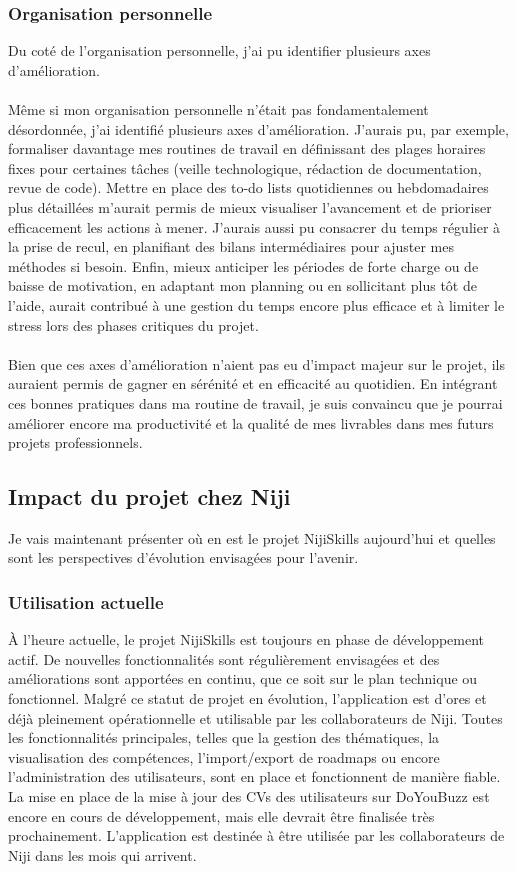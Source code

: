 \documentclass[12pt]{article}
\begin{document}
\subsubsection{Organisation personnelle}
Du coté de l'organisation personnelle, j'ai pu identifier plusieurs axes d'amélioration.
\\\\
Même si mon organisation personnelle n’était pas fondamentalement désordonnée, j’ai identifié plusieurs axes d’amélioration. J’aurais pu, par exemple, formaliser davantage mes routines de travail en définissant des plages horaires fixes pour certaines tâches (veille technologique, rédaction de documentation, revue de code). Mettre en place des to-do lists quotidiennes ou hebdomadaires plus détaillées m’aurait permis de mieux visualiser l’avancement et de prioriser efficacement les actions à mener. J’aurais aussi pu consacrer du temps régulier à la prise de recul, en planifiant des bilans intermédiaires pour ajuster mes méthodes si besoin. Enfin, mieux anticiper les périodes de forte charge ou de baisse de motivation, en adaptant mon planning ou en sollicitant plus tôt de l’aide, aurait contribué à une gestion du temps encore plus efficace et à limiter le stress lors des phases critiques du projet.
\\\\
Bien que ces axes d’amélioration n’aient pas eu d’impact majeur sur le projet, ils auraient permis de gagner en sérénité et en efficacité au quotidien. En intégrant ces bonnes pratiques dans ma routine de travail, je suis convaincu que je pourrai améliorer encore ma productivité et la qualité de mes livrables dans mes futurs projets professionnels.
\subsection{Impact du projet chez Niji}
Je vais maintenant présenter où en est le projet NijiSkills aujourd'hui et quelles sont les perspectives d'évolution envisagées pour l'avenir.
\subsubsection{Utilisation actuelle}
À l’heure actuelle, le projet NijiSkills est toujours en phase de développement actif. De nouvelles fonctionnalités sont régulièrement envisagées et des améliorations sont apportées en continu, que ce soit sur le plan technique ou fonctionnel. Malgré ce statut de projet en évolution, l’application est d’ores et déjà pleinement opérationnelle et utilisable par les collaborateurs de Niji. Toutes les fonctionnalités principales, telles que la gestion des thématiques, la visualisation des compétences, l’import/export de roadmaps ou encore l’administration des utilisateurs, sont en place et fonctionnent de manière fiable. La mise en place de la mise à jour des CVs des utilisateurs sur DoYouBuzz est encore en cours de développement, mais elle devrait être finalisée très prochainement.
L'application est destinée à être utilisée par les collaborateurs de Niji dans les mois qui arrivent.
\end{document}
